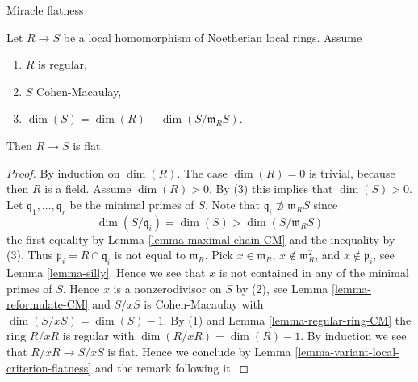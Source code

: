 \begin{lemma}
\label{lemma-CM-over-regular-flat}
\begin{slogan}
Miracle flatness
\end{slogan}
Let $R \to S$ be a local homomorphism of Noetherian local
rings. Assume
\begin{enumerate}
\item $R$ is regular,
\item $S$ Cohen-Macaulay,
\item $\dim(S) = \dim(R) + \dim(S/\mathfrak m_R S)$.
\end{enumerate}
Then $R \to S$ is flat.
\end{lemma}

\begin{proof}
By induction on $\dim(R)$. The case $\dim(R) = 0$ is trivial, because
then $R$ is a field. Assume $\dim(R) > 0$. By (3) this implies that
$\dim(S) > 0$. Let $\mathfrak q_1, \ldots, \mathfrak q_r$ be the minimal
primes of $S$. Note that $\mathfrak q_i \not \supset \mathfrak m_R S$ since
$$
\dim(S/\mathfrak q_i) = \dim(S) > \dim(S/\mathfrak m_R S)
$$
the first equality by Lemma \ref{lemma-maximal-chain-CM} and the
inequality by (3). Thus
$\mathfrak p_i = R \cap \mathfrak q_i$ is not equal to $\mathfrak m_R$.
Pick $x \in \mathfrak m_R$, $x \not \in \mathfrak m_R^2$, and
$x \not \in \mathfrak p_i$, see
Lemma \ref{lemma-silly}.
Hence we see that $x$ is not contained in any of the minimal
primes of $S$. Hence $x$ is a nonzerodivisor on $S$ by (2), see
Lemma \ref{lemma-reformulate-CM} and
$S/xS$ is Cohen-Macaulay with $\dim(S/xS) = \dim(S) - 1$.
By (1) and Lemma \ref{lemma-regular-ring-CM} the ring $R/xR$ is regular
with $\dim(R/xR) = \dim(R) - 1$.
By induction we see that $R/xR \to S/xS$ is flat. Hence we
conclude by Lemma \ref{lemma-variant-local-criterion-flatness}
and the remark following it.
\end{proof}